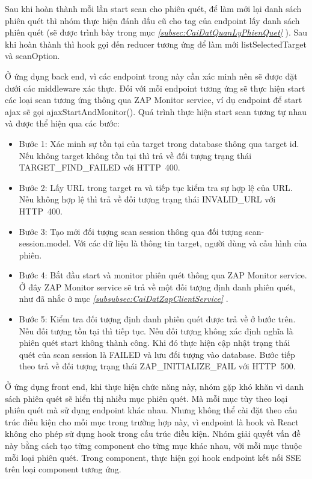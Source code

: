 Sau khi hoàn thành mỗi lần start scan cho phiên quét, để làm mới lại danh sách phiên quét thì nhóm thực hiện đánh dấu cũ cho tag của endpoint lấy danh sách phiên quét (sẽ được trình bày trong mục \textit{\ref{subsec:CaiDatQuanLyPhienQuet} }).
Sau khi hoàn thành thì hook gọi đến reducer tương ứng để làm mới listSelectedTarget và scanOption.

Ở ứng dụng back end, vì các endpoint trong này cần xác minh nên sẽ được đặt dưới các middleware xác thực.
Đối với mỗi endpoint tương ứng sẽ thực hiện start các loại scan tương ứng thông qua ZAP Monitor service, ví dụ endpoint để start ajax sẽ gọi ajaxStartAndMonitor().
Quá trình thực hiện start scan tương tự nhau và được thể hiện qua các bước:

\begin{itemize}
  \item Bước 1: Xác minh sự tồn tại của target trong database thông qua target id. Nếu không target không tồn tại thì trả về đối tượng trạng thái TARGET\_FIND\_FAILED với HTTP\ 400.
  \item Bước 2: Lấy URL trong target ra và tiếp tục kiểm tra sự hợp lệ của URL. Nếu không hợp lệ thì trả về đối tượng trạng thái INVALID\_URL với HTTP\ 400.
  \item Bước 3: Tạo mới đối tượng scan session thông qua đối tượng scan-session.model. Với các dữ liệu là thông tin target, người dùng và cấu hình của phiên.
  \item Bước 4: Bắt đầu start và monitor phiên quét thông qua ZAP Monitor service. Ở đây ZAP Monitor service sẽ trả về một đối tượng định danh phiên quét, như đã nhắc ở mục \textit{\ref{subsubsec:CaiDatZapClientService} }.
  \item Bước 5: Kiểm tra đối tượng định danh phiên quét được trả về ở bước trên. Nếu đối tượng tồn tại thì tiếp tục. Nếu đối tượng không xác định nghĩa là phiên quét start không thành công. Khi đó thực hiện cập nhật trạng thái quét của scan session là FAILED và lưu đối tượng vào database. Bước tiếp theo trả về đối tượng trạng thái ZAP\_INITIALIZE\_FAIL với HTTP\ 500.
\end{itemize}

Ở ứng dụng front end, khi thực hiện chức năng này, nhóm gặp khó khăn vì danh sách phiên quét sẽ hiển thị nhiều mục phiên quét.
Mà mỗi mục tùy theo loại phiên quét mà sử dụng endpoint khác nhau.
Nhưng không thể cài đặt theo cấu trúc điều kiện cho mỗi mục trong trường hợp này, vì endpoint là hook và React không cho phép sử dụng hook trong cấu trúc điều kiện.
Nhóm giải quyết vấn đề này bằng cách tạo từng component cho từng mục khác nhau, với mỗi mục thuộc mỗi loại phiên quét.
Trong component, thực hiện gọi hook endpoint kết nối SSE trên loại component tương ứng.

